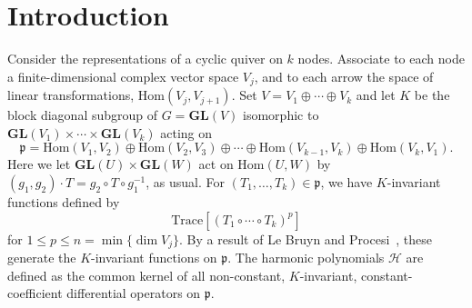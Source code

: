 \documentclass[11pt]{article}
\theoremstyle{definition}
\numberwithin{equation}{section}
\newcommand{\Ha}{\mathcal{H}}
\newcommand{\p}{\mathfrak{p}}
\newcommand{\GL}{\textbf{GL}}
\begin{document}
\section{Introduction}

Consider the representations of a cyclic quiver on $k$ nodes. Associate to each node a finite-dimensional complex vector space $V_j$, and to each arrow the space of linear transformations, $\mbox{Hom}(V_j, V_{j+1})$.  Set $V = V_1 \oplus \cdots \oplus V_k$ and let $K$ be the block diagonal subgroup of $G=\GL(V)$ isomorphic to $\GL(V_1) \times \cdots \times \GL(V_k)$ acting on
\begin{equation*}
    \mathfrak p = \mbox{Hom}(V_1,V_2) \oplus \mbox{Hom}(V_2,V_3) \oplus \cdots \oplus \mbox{Hom}(V_{k-1}, V_k) \oplus \mbox{Hom}(V_k, V_1).
\end{equation*}
Here we let $\GL(U) \times \GL(W)$ act on $\mbox{Hom}(U,W)$ by $(g_1,g_2) \cdot T  = g_2 \circ T \circ g_1^{-1}$, as usual. For $(T_1, \dots, T_k) \in \mathfrak p$, we have $K$-invariant functions defined by
\begin{equation*}
    \text{Trace}\left[ (T_1 \circ \cdots \circ T_k)^p \right]
\end{equation*}
for $1 \leq p \leq n = \min \{\dim V_j \}$. By a result of Le Bruyn and Procesi~\cite{LeBryunProcesi1990}, these generate the $K$-invariant functions on $\mathfrak p$. The harmonic polynomials $\Ha$ are defined as the common kernel of all non-constant, $K$-invariant, constant-coefficient differential operators on $\p$. 
\end{document}
